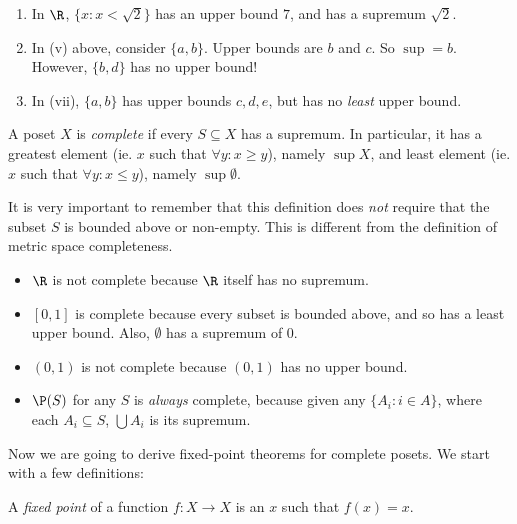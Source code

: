 \documentclass[a4paper]{article}
\begin{document}
\begin{eg}\leavevmode
  \begin{enumerate}
    \item In $\R$, $\{x: x < \sqrt{2}\}$ has an upper bound $7$, and has a supremum $\sqrt{2}$.

    \item In (v) above, consider $\{a, b\}$. Upper bounds are $b$ and $c$. So $\sup  = b$. However, $\{b, d\}$ has no upper bound!
    \item In (vii), $\{a, b\}$ has upper bounds $c, d, e$, but has no \emph{least} upper bound.
  \end{enumerate}
\end{eg}

\begin{defi}
  A poset $X$ is \emph{complete} if every $S\subseteq X$ has a supremum. In particular, it has a greatest element (ie. $x$ such that $\forall y: x \geq y$), namely $\sup X$, and least element (ie. $x$ such that $\forall y: x \leq y$), namely $\sup \emptyset$.
\end{defi}
It is very important to remember that this definition does \emph{not} require that the subset $S$ is bounded above or non-empty. This is different from the definition of metric space completeness.

\begin{eg}\leavevmode
  \begin{itemize}
    \item $\R$ is not complete because $\R$ itself has no supremum.
    \item $[0, 1]$ is complete because every subset is bounded above, and so has a least upper bound. Also, $\emptyset$ has a supremum of $0$.
    \item $(0, 1)$ is not complete because $(0, 1)$ has no upper bound.
    \item $\P(S)$ for any $S$ is \emph{always} complete, because given any $\{A_i: i\in A\}$, where each $A_i\subseteq S$, $\bigcup A_i$ is its supremum.
  \end{itemize}
\end{eg}

Now we are going to derive fixed-point theorems for complete posets. We start with a few definitions:

\begin{defi}
  A \emph{fixed point} of a function $f:X\to X$ is an $x$ such that $f(x) = x$.
\end{defi}
\end{document}
